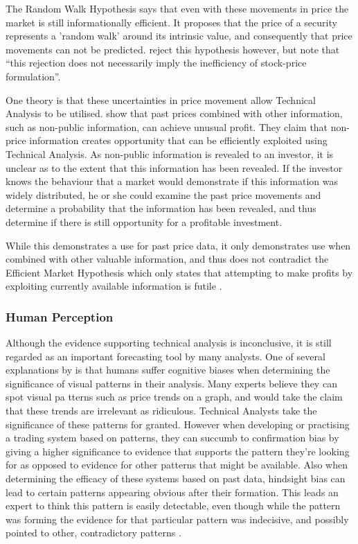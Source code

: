 \documentclass{article}
\theoremstyle{definition}
\begin{document}
The Random Walk Hypothesis says that even with these movements in price the market is still informationally efficient. It proposes that the price of a security represents a 'random walk' around its intrinsic value, and consequently that price movements can not be predicted. \cite{lo1988} reject this hypothesis however, but note that ``this rejection does not necessarily imply the inefficiency of stock-price formulation''.

One theory is that these uncertainties in price movement allow Technical Analysis to be utilised. \cite{indefenseof} show that past prices combined with other information, such as non-public information, can achieve unusual profit. They claim that non-price information creates opportunity that can be efficiently exploited using Technical Analysis. As non-public information is revealed to an investor, it is unclear as to the extent that this information has been revealed. If the investor knows the behaviour that a market would demonstrate if this information was widely distributed, he or she could examine the past price movements and determine a probability that the information has been revealed, and thus determine if there is still opportunity for a profitable investment.

While this demonstrates a use for past price data, it only demonstrates use when combined with other valuable information, and thus does not contradict the Efficient Market Hypothesis which only states that attempting to make profits by exploiting currently available information is futile \citep{taprofitability}.

\subsubsection{Human Perception}

Although the evidence supporting technical analysis is inconclusive, it is still regarded as an important forecasting tool by many analysts. One of several explanations by \cite[p.45-71]{aronson2011evidence} is that humans suffer cognitive biases when determining the significance of visual patterns in their analysis. Many experts believe they can spot visual pa	tterns such as price trends on a graph, and would take the claim that these trends are irrelevant as ridiculous. Technical Analysts take the significance of these patterns for granted. However when developing or practising a trading system based on patterns, they can succumb to confirmation bias by giving a higher significance to evidence that supports the pattern they're looking for as opposed to evidence for other patterns that might be available. Also when determining the efficacy of these systems based on past data, hindsight bias can lead to certain patterns appearing obvious after their formation. This leads an expert to think this pattern is easily detectable, even though while the pattern was forming the evidence for that particular pattern was indecisive, and possibly pointed to other, contradictory patterns \cite[p.62]{aronson2011evidence}.
\end{document}
